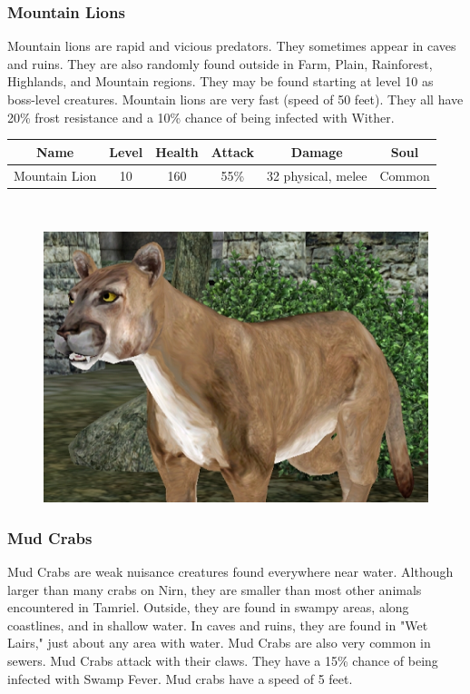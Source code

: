 \documentclass[12pt]{book}
\begin{document}
\subsubsection{Mountain Lions}
Mountain lions are rapid and vicious predators. They sometimes appear in caves and ruins. They are also randomly found outside in Farm, Plain, Rainforest, Highlands, and Mountain regions. They may be found starting at level 10 as boss-level creatures. Mountain lions are very fast (speed of 50 feet). They all have 20\% frost resistance and a 10\% chance of being infected with Wither.\\

\begin{tabular}{|c|c|c|c|c|c|}
\hline
Name & Level & Health & Attack & Damage & Soul\\ \hline
Mountain Lion & 10 & 160 & 55\% & 32 physical, melee & Common\\ \hline
\end{tabular}\\

\begin{figure}[h]
	\centering
	\includegraphics[scale=1]{mountainlion.png}
\end{figure}

\subsubsection{Mud Crabs}
Mud Crabs are weak nuisance creatures found everywhere near water. Although larger than many crabs on Nirn, they are smaller than most other animals encountered in Tamriel. Outside, they are found in swampy areas, along coastlines, and in shallow water. In caves and ruins, they are found in "Wet Lairs," just about any area with water. Mud Crabs are also very common in sewers. Mud Crabs attack with their claws. They have a 15\% chance of being infected with Swamp Fever. Mud crabs have a speed of 5 feet.
\end{document}
